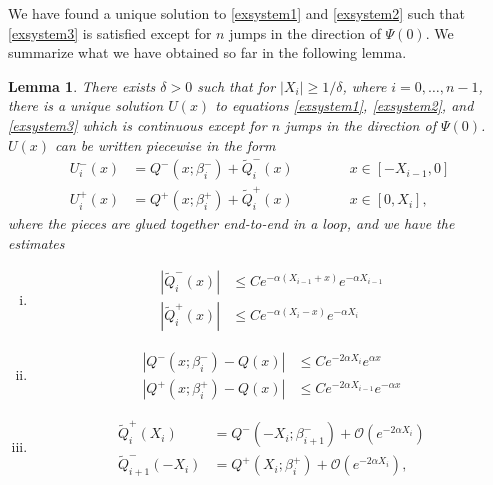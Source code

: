\documentclass[12pt]{elsarticle}
\theoremstyle{plain}
\newtheorem{lemma}[theorem]{Lemma}
\theoremstyle{definition}
\theoremstyle{remark}
\numberwithin{theorem}{section}
\numberwithin{equation}{section}
\begin{document}
We have found a unique solution to \cref{exsystem1} and \cref{exsystem2} such that \cref{exsystem3} is satisfied except for $n$ jumps in the direction of $\Psi(0)$. We summarize what we have obtained so far in the following lemma.


\begin{lemma}\label{solvewithjumps}
There exists $\delta > 0$ such that for $|X_i| \geq 1/\delta$, where $i = 0, \dots, n-1$, there is a unique solution $U(x)$ to equations \cref{exsystem1}, \cref{exsystem2}, and \cref{exsystem3} which is continuous except for $n$ jumps in the direction of $\Psi(0)$. $U(x)$ can be written piecewise in the form 
\begin{equation}\label{Upiecewise2}
\begin{aligned}
U_i^-(x) &= Q^-(x; \beta_i^-) + \tilde{Q}_i^-(x) \qquad\qquad x \in [-X_{i-1}, 0] \\
U_i^+(x) &= Q^+(x; \beta_i^+) + \tilde{Q}_i^+(x) \qquad\qquad x \in [0, X_i],
\end{aligned}
\end{equation}
where the pieces are glued together end-to-end in a loop, and we have the estimates
\begin{enumerate}[(i)]
\item
\begin{equation}\label{tildeQbounds}
\begin{aligned}
|\tilde{Q}_i^-(x)| &\leq C e^{-\alpha(X_{i-1} + x)}e^{-\alpha X_{i-1}} \\
|\tilde{Q}_i^+(x)| &\leq C e^{-\alpha(X_i - x)}e^{-\alpha X_i} 
\end{aligned}
\end{equation}
\item 
\begin{equation}
\begin{aligned}\label{Qpmbounds}
|Q^-(x; \beta_i^-) - Q(x)| &\leq C e^{-2 \alpha X_i} e^{\alpha x} \\
|Q^+(x; \beta_i^+) - Q(x)| &\leq C e^{-2 \alpha X_{i-1}} e^{-\alpha x}
\end{aligned}
\end{equation}
\item
\begin{equation}\label{VQpm}
\begin{aligned}
\tilde{Q}_i^+(X_i) &= Q^-(-X_i; \beta_{i+1}^-) + \mathcal{O}(e^{-2 \alpha X_i}) \\
\tilde{Q}_{i+1}^-(-X_i) &= Q^+(X_i; \beta_i^+) + \mathcal{O}(e^{-2 \alpha X_i}),

\end{aligned}
\end{equation}
\end{enumerate}
\end{lemma}
\end{document}
